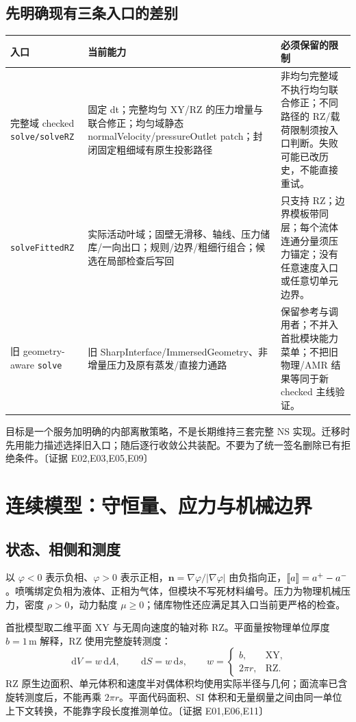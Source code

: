 \documentclass[UTF8,a4paper,11pt,fontset=fandol]{ctexart}
\newcommand{\code}[1]{\nolinkurl{#1}}
\newcommand{\ev}[1]{{\small\color{muted}〔证据 #1〕}}
\newcommand{\dd}{\,\mathrm d}\newcommand{\uu}{\bm u}\newcommand{\nn}{\bm n}
\begin{document}
\subsection{先明确现有三条入口的差别}
\begin{longtable}{@{}P{.19\textwidth}P{.39\textwidth}P{.36\textwidth}@{}}
\toprule 入口 & 当前能力 & 必须保留的限制\\\midrule\endhead
完整域 checked \code{solve/solveRZ} & 固定 dt；完整均匀 XY/RZ 的压力增量与联合修正；均匀域静态 normalVelocity/pressureOutlet patch；封闭固定粗细域有原生投影路径 & 非均匀完整域不执行均匀联合修正；不同路径的 RZ/载荷限制须按入口判断。失败可能已改历史，不能直接重试。\\
\code{solveFittedRZ} & 实际活动叶域；固壁无滑移、轴线、压力储库/一向出口；规则/边界/粗细行组合；候选在局部检查后写回 & 只支持 RZ；边界模板带同层；每个流体连通分量须压力锚定；没有任意速度入口或任意切单元边界。\\
旧 geometry-aware \code{solve} & 旧 SharpInterface/ImmersedGeometry、非增量压力及原有蒸发/直接力通路 & 保留参考与调用者；不并入首批模块能力菜单；不把旧物理/AMR 结果等同于新 checked 主线验证。\\
\bottomrule
\end{longtable}
目标是一个服务加明确的内部离散策略，不是长期维持三套完整 NS 实现。迁移时先用能力描述选择旧入口；随后逐行收敛公共装配。不要为了统一签名删除已有拒绝条件。\ev{E02,E03,E05,E09}

\section{连续模型：守恒量、应力与机械边界}
\subsection{状态、相侧和测度}
以 $\varphi<0$ 表示负相、$\varphi>0$ 表示正相，$\nn=\nabla\varphi/|\nabla\varphi|$ 由负指向正，$[\![a]\!]=a^+-a^-$。喷嘴绑定负相为液体、正相为气体，但模块不写死材料编号。压力为物理机械压力，密度 $\rho>0$，动力黏度 $\mu\ge0$；储库物性还应满足其入口当前更严格的检查。

首批模型取二维平面 XY 与无周向速度的轴对称 RZ。平面量按物理单位厚度 $b=1\,\mathrm m$ 解释，RZ 使用完整旋转测度：
\begin{equation}
 \dd V=w\dd A,\qquad\dd S=w\dd s,\qquad
 w=\begin{cases}b,&\text{XY},\\2\pi r,&\text{RZ}.\end{cases}
\end{equation}
RZ 原生边面积、单元体积和速度半对偶体积均使用实际半径与几何；面流率已含旋转测度后，不能再乘 $2\pi r$。平面代码面积、SI 体积和无量纲量之间由同一单位上下文转换，不能靠字段长度推测单位。\ev{E01,E06,E11}
\end{document}
